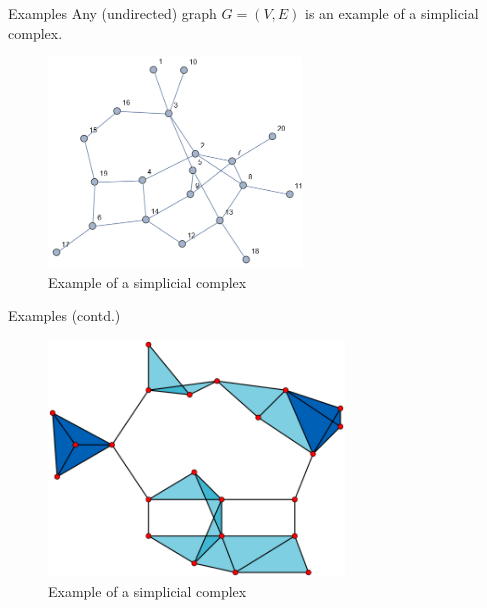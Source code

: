 \documentclass[10pt]{beamer}
\begin{document}
\begin{frame}{Examples}
    Any (undirected) graph $G = (V, E)$ is an example of a simplicial complex. 
    \begin{figure}[H]
        \centering
        \includegraphics[width=0.6\textwidth]{imgs/RandomGraph.png}
        \caption{Example  of a simplicial complex}
        \label{fig:enter-label}
    \end{figure}
\end{frame}

\begin{frame}{Examples (contd.)}
    \begin{figure}[H]
        \centering
        \includegraphics[width  = 0.7\textwidth]{imgs/Simplicial-Complex-Example.png}
        \caption{Example of a simplicial complex}
        \label{fig:enter-label}
    \end{figure}
\end{frame}
\end{document}
